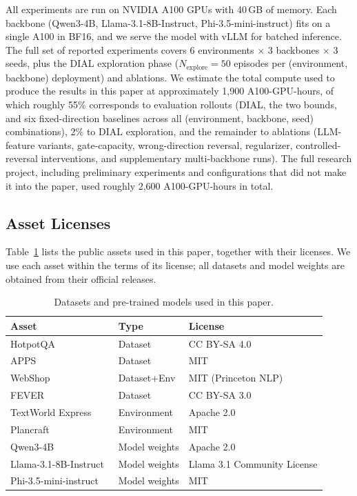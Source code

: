 All experiments are run on NVIDIA A100 GPUs with 40\,GB of memory.
Each backbone (Qwen3-4B, Llama-3.1-8B-Instruct, Phi-3.5-mini-instruct)
fits on a single A100 in BF16, and we serve the model with vLLM for
batched inference. The full set of reported experiments covers
6 environments $\times$ 3 backbones $\times$ 3 seeds, plus the
DIAL exploration phase ($N_{\text{explore}}{=}50$ episodes per
(environment, backbone) deployment) and ablations.
We estimate the total compute used to produce the results in this
paper at approximately {1{,}900} A100-GPU-hours, of which
roughly {55\%} corresponds to evaluation rollouts (DIAL,
the two bounds, and six fixed-direction baselines across all
(environment, backbone, seed) combinations), {2\%} to DIAL
exploration, and the remainder to ablations (LLM-feature variants,
gate-capacity, wrong-direction reversal, regularizer,
controlled-reversal interventions, and supplementary multi-backbone
runs). The full research project, including preliminary experiments
and configurations that did not make it into the paper, used
roughly {2{,}600} A100-GPU-hours in total.

\subsection{Asset Licenses}
\label{app:licenses}

Table~\ref{tab:licenses} lists the public assets used in this
paper, together with their licenses. We use each asset within the
terms of its license; all datasets and model weights are obtained
from their official releases.

\begin{table}[h!]
\caption{Datasets and pre-trained models used in this paper.}
\label{tab:licenses}
\centering\small
\begin{tabular}{lll}
\toprule
\textbf{Asset} & \textbf{Type} & \textbf{License} \\
\midrule
HotpotQA~\cite{yang2018hotpotqa}              & Dataset       & CC BY-SA 4.0 \\
APPS~\cite{hendrycks2021apps}                 & Dataset       & MIT \\
WebShop~\cite{yao2022webshop}                 & Dataset+Env   & MIT (Princeton NLP) \\
FEVER~\cite{thorne2018fever}                  & Dataset       & CC BY-SA 3.0 \\
TextWorld Express~\cite{jansen2023twexpress}  & Environment   & Apache 2.0 \\
Plancraft~\cite{dagan2024plancraft}           & Environment   & MIT \\
Qwen3-4B~\cite{DBLP:journals/corr/abs-2505-09388}        & Model weights & Apache 2.0 \\
Llama-3.1-8B-Instruct~\cite{DBLP:journals/corr/abs-2407-21783} & Model weights & Llama 3.1 Community License \\
Phi-3.5-mini-instruct~\cite{DBLP:journals/corr/abs-2404-14219} & Model weights & MIT \\
\bottomrule
\end{tabular}
\end{table}



